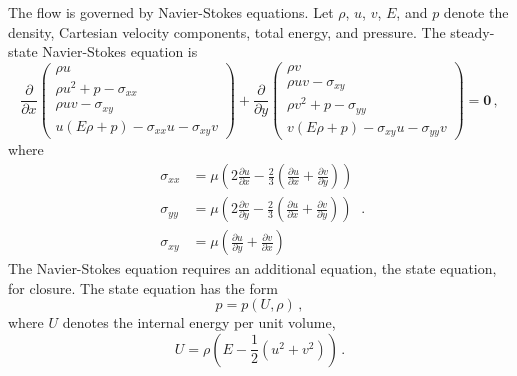 The flow is governed by Navier-Stokes equations.
Let $\rho$, $u$, $v$, $E$, and $p$ denote the density, Cartesian velocity components, 
total energy, and pressure.
The steady-state Navier-Stokes equation is
\begin{equation}
    \frac{\partial}{\partial x} 
    \begin{pmatrix}
        \rho u\\
        \rho u^2 + p - \sigma_{xx}\\
        \rho uv - \sigma_{xy}\\
        u(E\rho+p) - \sigma_{xx} u - \sigma_{xy} v
    \end{pmatrix}
    + \frac{\partial}{\partial y}
    \begin{pmatrix}
        \rho v\\
        \rho uv-\sigma_{xy}\\
        \rho v^2+p-\sigma_{yy}\\
        v(E\rho+p) - \sigma_{xy} u -\sigma_{yy}v
    \end{pmatrix} 
    = \boldsymbol{0}\,,
    \label{NSeqn}
\end{equation}
where
\begin{equation}\begin{split}
    \sigma_{xx} &= \mu \left(2 \frac{\partial u}{\partial x} - \frac{2}{3} \left(\frac{\partial u}{\partial x} 
    + \frac{\partial v}{\partial y}\right)\right)\\
    \sigma_{yy} &= \mu \left(2 \frac{\partial v}{\partial y} - \frac{2}{3} \left(\frac{\partial u}{\partial x} 
    + \frac{\partial v}{\partial y}\right)\right)\\
    \sigma_{xy}&=\mu\left(\frac{\partial u}{\partial y} + \frac{\partial v}{\partial x}\right)
\end{split}\,.\end{equation}
The Navier-Stokes equation requires an additional equation, the state equation, for closure.
The state equation has the form
\begin{equation}
    p = p(U, \rho)\,,
    \label{state equation}
\end{equation}
where $U$ denotes the internal energy per unit volume,
\begin{equation}
    U = \rho\left(E-\frac{1}{2}(u^2+v^2)\right)\,.
\end{equation}

